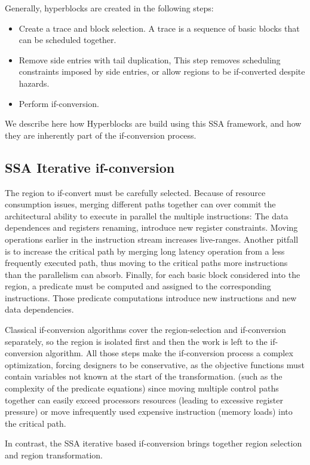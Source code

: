 Generally, hyperblocks are created in the following steps:
\begin{itemize}
\item Create a trace and block selection. A trace is a sequence of basic blocks that can be scheduled together. 
\item Remove side entries with tail duplication, This step removes scheduling constraints imposed by side entries, or allow regions to be if-converted despite hazards.
\item Perform if-conversion.
\end{itemize}

We describe here how Hyperblocks are build using this SSA framework, and how they are inherently part of the if-conversion process.

\subsection{SSA Iterative if-conversion}

The region to if-convert must be carefully selected. Because of resource consumption issues, merging different paths together can over commit the architectural ability to execute in parallel the multiple instructions: The data dependences and registers renaming, introduce new register constraints. Moving operations earlier in the instruction stream increases live-ranges. 
Another pitfall is to increase the critical path by merging long latency operation from a less frequently executed path, thus moving to the critical paths more instructions than the parallelism can absorb.
Finally, for each basic block considered into the region, a predicate must be computed and assigned to the corresponding instructions. Those predicate computations introduce new instructions and new data dependencies.

Classical if-conversion algorithms cover the region-selection and if-conversion separately, so the region is isolated first and then the work is left to the if-conversion algorithm. All those steps make the if-conversion process a complex optimization, forcing designers to be conservative, as the objective functions must contain variables not known at the start of the transformation. (such as the complexity of the predicate equations) since moving multiple control paths together can easily exceed processors resources (leading to excessive register pressure) or move infrequently used expensive instruction (memory loads) into the critical path. 

In contrast, the SSA iterative based if-conversion brings together region selection and region transformation.

